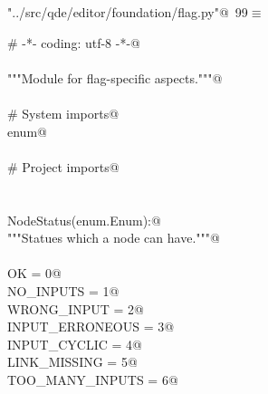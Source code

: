 \documentclass[
    a4paper,      %
    10pt,         %
    openright,    %
    notitlepage,  %
    parskip=half, %
]{scrreprt}       %
\theoremstyle{definition}                    %
\begin{document}
\begin{flushleft} \small
\begin{minipage}{\linewidth}\label{scrap160}\raggedright\small
{} \verb@"../src/qde/editor/foundation/flag.py"@\nobreak\ {\footnotesize {99}}$\equiv$
\vspace{-1ex}
\begin{list}{}{} \item
\mbox{}\lstinline@# -*- coding: utf-8 -*-@\\
\mbox{}\lstinline@@\\
\mbox{}\lstinline@"""Module for flag-specific aspects."""@\\
\mbox{}\lstinline@@\\
\mbox{}\lstinline@# System imports@\\
\mbox{}\lstinline@import enum@\\
\mbox{}\lstinline@@\\
\mbox{}\lstinline@# Project imports@\\
\mbox{}\lstinline@@\\
\mbox{}\lstinline@@\\
\mbox{}\lstinline@class NodeStatus(enum.Enum):@\\
\mbox{}\lstinline@    """Statues which a node can have."""@\\
\mbox{}\lstinline@@\\
\mbox{}\lstinline@    OK              = 0@\\
\mbox{}\lstinline@    NO_INPUTS       = 1@\\
\mbox{}\lstinline@    WRONG_INPUT     = 2@\\
\mbox{}\lstinline@    INPUT_ERRONEOUS = 3@\\
\mbox{}\lstinline@    INPUT_CYCLIC    = 4@\\
\mbox{}\lstinline@    LINK_MISSING    = 5@\\
\mbox{}\lstinline@    TOO_MANY_INPUTS = 6@\\
\mbox{}\lstinline@@{\NWsep}
\end{list}
\vspace{-1.5ex}
\footnotesize
\begin{list}{}{\setlength{\itemsep}{-\parsep}\setlength{\itemindent}{-\leftmargin}}

\item{}
\end{list}
\end{minipage}\vspace{4ex}
\end{flushleft}
\end{document}
